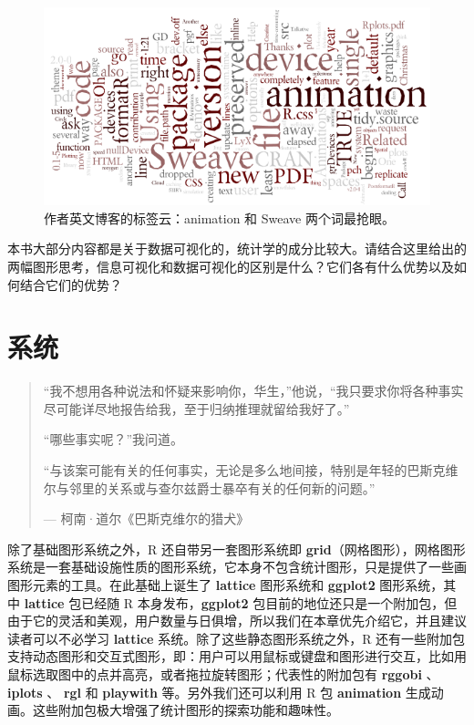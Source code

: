 \documentclass[
  b5paper,
  UTF8,twoside]{book}
\begin{document}
\begin{enumerate}
  \begin{figure}

  {\centering \includegraphics{images/yihui-name-wordle} 

  }

  \caption[作者英文博客的标签云]{作者英文博客的标签云：animation 和 Sweave 两个词最抢眼。}\label{fig:yihui-name-wordle}
  \end{figure}

  本书大部分内容都是关于数据可视化的，统计学的成分比较大。请结合这里给出的两幅图形思考，信息可视化和数据可视化的区别是什么？它们各有什么优势以及如何结合它们的优势？
\end{enumerate}









\hypertarget{chap:system}{%
\chapter{系统}\label{chap:system}}

\begin{quote}
``我不想用各种说法和怀疑来影响你，华生，''他说，``我只要求你将各种事实尽可能详尽地报告给我，至于归纳推理就留给我好了。''

``哪些事实呢？''我问道。

``与该案可能有关的任何事实，无论是多么地间接，特别是年轻的巴斯克维尔与邻里的关系或与查尔兹爵士暴卒有关的任何新的问题。''

\hspace*{\fill} --- 柯南·道尔《巴斯克维尔的猎犬》
\end{quote}

除了基础图形系统之外，R 还自带另一套图形系统即 \textbf{grid}（网格图形），网格图形系统是一套基础设施性质的图形系统，它本身不包含统计图形，只是提供了一些画图形元素的工具。在此基础上诞生了 \textbf{lattice} 图形系统和 \textbf{ggplot2} 图形系统，其中 \textbf{lattice} 包已经随 R 本身发布，\textbf{ggplot2} 包目前的地位还只是一个附加包，但由于它的灵活和美观，用户数量与日俱增，所以我们在本章优先介绍它，并且建议读者可以不必学习 \textbf{lattice} 系统。除了这些静态图形系统之外，R 还有一些附加包支持动态图形和交互式图形，即：用户可以用鼠标或键盘和图形进行交互，比如用鼠标选取图中的点并高亮，或者拖拉旋转图形；代表性的附加包有 \textbf{rggobi} 、 \textbf{iplots} 、 \textbf{rgl} 和 \textbf{playwith} 等。另外我们还可以利用 R 包 \textbf{animation} 生成动画。这些附加包极大增强了统计图形的探索功能和趣味性。
\end{document}
